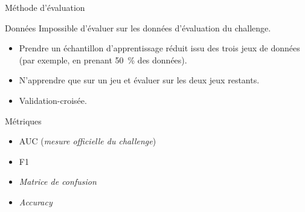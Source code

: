 \documentclass[compress,xcolor=table]{beamer}
\begin{document}
\begin{frame}{Méthode d'évaluation}

    \begin{exampleblock}{Données}
        Impossible d'évaluer sur les données d'évaluation du challenge.
        \begin{itemize}
            \item Prendre un échantillon d'apprentissage réduit issu des trois jeux de données (par exemple, en prenant 50~\% des données).
            \item N'apprendre que sur un jeu et évaluer sur les deux jeux restants.
            \item Validation-croisée.
        \end{itemize}
    \end{exampleblock}

    \begin{exampleblock}{Métriques}
        \begin{itemize}
            \item AUC (\textit{mesure officielle du challenge})
            \item F1
            \item \textit{Matrice de confusion}
            \item \textit{Accuracy}
        \end{itemize}
    \end{exampleblock}

\end{frame}
\end{document}
